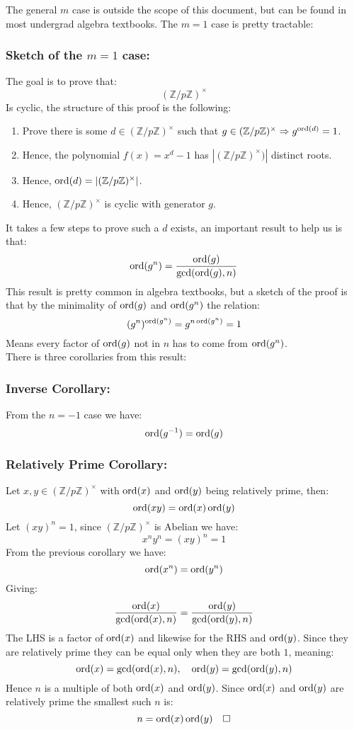 The general $m$ case is outside the scope of this document,
but can be found in most undergrad algebra textbooks.
The $m = 1$ case is pretty tractable:

\subsubsection{Sketch of the $m = 1$ case:}
The goal is to prove that:
\[(\mathbb{Z}/p\mathbb{Z})^\times\]
Is cyclic, the structure of this proof is the following:
\begin{enumerate}
	\item Prove there is some $d\in(\mathbb{Z}/p\mathbb{Z})^\times$ such that $g\in(\mathbb{Z}/p\mathbb{Z})^\times \Rightarrow g^{\operatorname{ord}(d)}=1$.
	\item Hence, the polynomial $f(x)=x^d-1$ has $|(\mathbb{Z}/p\mathbb{Z})^\times)|$ distinct roots.
	\item Hence, $\operatorname{ord}(d)=|(\mathbb{Z}/p\mathbb{Z})^\times|$.
	\item Hence, $(\mathbb{Z}/p\mathbb{Z})^\times$ is cyclic with generator $g$.
\end{enumerate}
It takes a few steps to prove such a $d$ exists,
an important result to help us is that:
\[\operatorname{ord}(g^n) = \frac{\operatorname{ord}(g)}{\gcd(\operatorname{ord}(g),n)}\]
This result is pretty common in algebra textbooks, 
but a sketch of the proof is that by the minimality of $\operatorname{ord}(g)$ and $\operatorname{ord}(g^n)$ the relation:
\[(g^{n})^{\operatorname{ord}(g^n)} = g^{n\operatorname{ord}(g^n)}=1\] 
Means every factor of $\operatorname{ord}(g)$ not in $n$ has to come from $\operatorname{ord}(g^n)$.
\\
There is three corollaries from this result:

\subsubsection{Inverse Corollary:}
From the $n=-1$ case we have:
\[\operatorname{ord}(g^{-1})=\operatorname{ord}(g)\]

\subsubsection{Relatively Prime Corollary:}
Let $x,y\in(\mathbb{Z}/p\mathbb{Z})^\times$ with $\operatorname{ord}(x)$ and $\operatorname{ord}(y)$ being relatively prime,
then:
\[\operatorname{ord}(xy) = \operatorname{ord}(x)\operatorname{ord}(y)\]
Let $(xy)^n=1$, since $(\mathbb{Z}/p\mathbb{Z})^\times$ is Abelian we have:
\[x^ny^n = (xy)^n=1\]
From the previous corollary we have:
\[\operatorname{ord}(x^n) = \operatorname{ord}(y^n)\]
Giving:
\[\frac{\operatorname{ord}(x)}{\gcd(\operatorname{ord}(x),n)}=\frac{\operatorname{ord}(y)}{\gcd(\operatorname{ord}(y),n)}\]
The LHS is a factor of $\operatorname{ord}(x)$ and likewise for the RHS and $\operatorname{ord}(y)$.
Since they are relatively prime they can be equal only when they are both $1$,
meaning:
\[\operatorname{ord}(x) = \gcd(\operatorname{ord}(x),n),\quad\operatorname{ord}(y)=\gcd(\operatorname{ord}(y),n)\]
Hence $n$ is a multiple of both $\operatorname{ord}(x)$ and $\operatorname{ord}(y)$.
Since $\operatorname{ord}(x)$ and $\operatorname{ord}(y)$ are relatively prime the smallest such $n$ is:
\[n=\operatorname{ord}(x)\operatorname{ord}(y)\quad\square\]

